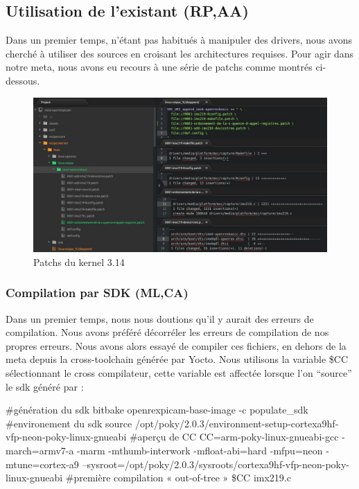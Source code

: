 {\subsection{Utilisation de l'existant (RP,AA)}

Dans un premier temps, n’étant pas habitués à manipuler des drivers, nous avons
cherché à utiliser des sources en croisant les architectures requises. Pour agir dans notre meta,
nous avons eu recours à une série de patchs comme montrés ci-dessous.

\begin{figure}[!htb]
    \centering
    \includegraphics[trim={0cm 0cm 0cm 0cm},clip,scale=0.35]{Figures/patchs.png}
    \decoRule
    \caption{Patchs du kernel 3.14} \label{fig:patchs}
\end{figure} 

\subsubsection{Compilation par SDK (ML,CA)}

Dans un premier temps, nous nous doutions qu’il y aurait des erreurs de compilation.
Nous avons préféré décorréler les erreurs de compilation de nos propres erreurs. Nous
avons alors essayé de compiler ces fichiers, en dehors de la meta depuis la
cross-toolchain générée par Yocto. Nous utilisons la variable \$CC sélectionnant le cross
compilateur, cette variable est affectée lorsque l’on “source” le sdk généré par :

\begin{tcolorbox}
    \#génération du sdk
    bitbake openrexpicam-base-image -c populate\_sdk
    \#environement du sdk
    source /opt/poky/2.0.3/environment-setup-cortexa9hf-vfp-neon-poky-linux-gnueabi
    \#aperçu de CC
    CC=arm-poky-linux-gnueabi-gcc -march=armv7-a -marm -mthumb-interwork -mfloat-abi=hard -mfpu=neon
    -mtune=cortex-a9 –sysroot=/opt/poky/2.0.3/sysroots/cortexa9hf-vfp-neon-poky-linux-gnueabi
    \#première compilation « out-of-tree »
    \$CC imx219.c
\end{tcolorbox}

}
